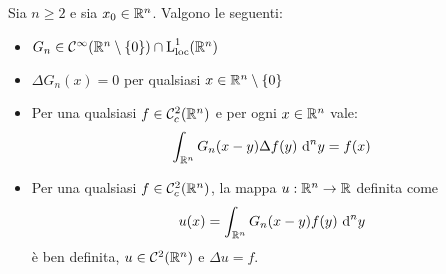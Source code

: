 \documentclass{article}
\begin{document}
\begin{theorem}{}{}
    Sia $n\ge 2$ e sia $x_0 \in \mathbb{R}^n$. Valgono le seguenti:\begin{itemize}
        \item $G_n \in \mathcal{C}^\infty(\mathbb{R}^n \setminus \{0\})\cap \operatorname{L}_{\text{loc}}^1(\mathbb{R}^n)$
        \item $\Delta G_n(x) = 0$ per qualsiasi $x \in \mathbb{R}^n \setminus \{0\}$
        \item Per una qualsiasi $f\in\mathcal{C}^2_c(\mathbb{R}^n)$ e per ogni $x \in \mathbb{R}^n$ vale:
        \[\int_{\mathbb{R}^n}G_n(x-y)\Delta f(y) \text{ d}^n y = f(x)\]
        \item Per una qualsiasi $f\in\mathcal{C}^2_c(\mathbb{R}^n)$, la mappa $u:\mathbb{R}^n\to\mathbb{R}$ definita come
        \[u(x) = \int_{\mathbb{R}^n} G_n(x-y)f(y)\text{ d}^n y\]
        è ben definita, $u\in \mathcal{C}^2(\mathbb{R}^n)$ e $\Delta u = f$. 
    \end{itemize}
\end{theorem}
\end{document}

